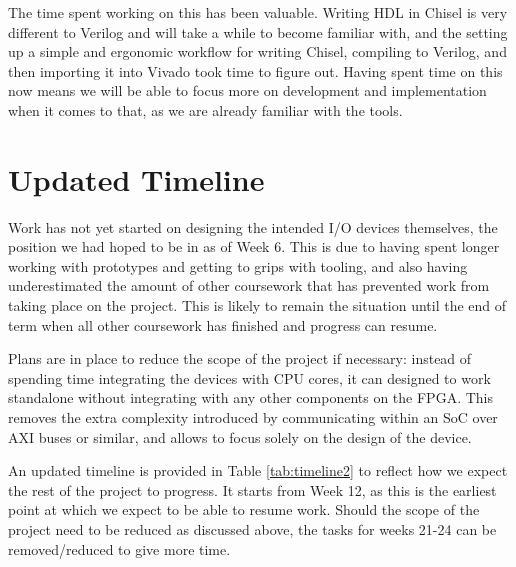 \documentclass[a4paper,fleqn,12pt]{article}
\begin{document}
The time spent working on this has been valuable. Writing HDL in Chisel is very different to Verilog and will take a while to become familiar with, and the setting up a simple and ergonomic workflow for writing Chisel, compiling to Verilog, and then importing it into Vivado took time to figure out. Having spent time on this now means we will be able to focus more on development and implementation when it comes to that, as we are already familiar with the tools.

\section{Updated Timeline}

Work has not yet started on designing the intended I/O devices themselves, the position we had hoped to be in as of Week 6. This is due to having spent longer working with prototypes and getting to grips with tooling, and also having underestimated the amount of other coursework that has prevented work from taking place on the project. This is likely to remain the situation until the end of term when all other coursework has finished and progress can resume.

Plans are in place to reduce the scope of the project if necessary: instead of spending time integrating the devices with CPU cores, it can designed to work standalone without integrating with any other components on the FPGA. This removes the extra complexity introduced by communicating within an SoC over AXI buses or similar, and allows to focus solely on the design of the device.

An updated timeline is provided in Table \ref{tab:timeline2} to reflect how we expect the rest of the project to progress. It starts from Week 12, as this is the earliest point at which we expect to be able to resume work. Should the scope of the project need to be reduced as discussed above, the tasks for weeks 21-24 can be removed/reduced to give more time.
\end{document}
